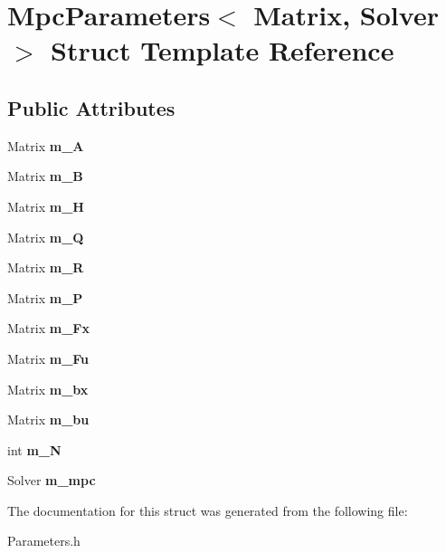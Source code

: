 \hypertarget{structMpcParameters}{}\section{Mpc\+Parameters$<$ Matrix, Solver $>$ Struct Template Reference}
\label{structMpcParameters}
\subsection*{Public Attributes}
\begin{DoxyCompactItemize}
\item 
\mbox{\label{structMpcParameters_a79445e0b7c110fc851cbadb75a5d28f6}} 
Matrix {\bfseries m\+\_\+A}
\item 
\mbox{\label{structMpcParameters_ab79d562d3a42d137a0eda18ca8027fcb}} 
Matrix {\bfseries m\+\_\+B}
\item 
\mbox{\label{structMpcParameters_a13ba8bf485b3bae0041c919187a6706e}} 
Matrix {\bfseries m\+\_\+H}
\item 
\mbox{\label{structMpcParameters_a9c5d33307452c94180f11fb7314e60b2}} 
Matrix {\bfseries m\+\_\+Q}
\item 
\mbox{\label{structMpcParameters_ac8f6e1d3ed3284f0933ac0322ee8d6fb}} 
Matrix {\bfseries m\+\_\+R}
\item 
\mbox{\label{structMpcParameters_a7fd057b268d80c18324fa8d290c861a5}} 
Matrix {\bfseries m\+\_\+P}
\item 
\mbox{\label{structMpcParameters_aa6d3751ae7b0c3451e4ff1784ea51414}} 
Matrix {\bfseries m\+\_\+\+Fx}
\item 
\mbox{\label{structMpcParameters_a351c4c9571448599dd6a316aab86a561}} 
Matrix {\bfseries m\+\_\+\+Fu}
\item 
\mbox{\label{structMpcParameters_ac5cfb3944597177d897690d075d26352}} 
Matrix {\bfseries m\+\_\+bx}
\item 
\mbox{\label{structMpcParameters_aa73c5be2bd31a8e6c688ad20f735a9c3}} 
Matrix {\bfseries m\+\_\+bu}
\item 
\mbox{\label{structMpcParameters_a11b5664a2c91346e4023d7f4617f7bbb}} 
int {\bfseries m\+\_\+N}
\item 
\mbox{\label{structMpcParameters_a35a521d3eceb5ffde01196bc67527e69}} 
Solver {\bfseries m\+\_\+mpc}
\end{DoxyCompactItemize}


The documentation for this struct was generated from the following file\+:\begin{DoxyCompactItemize}
\item 
Parameters.\+h\end{DoxyCompactItemize}
